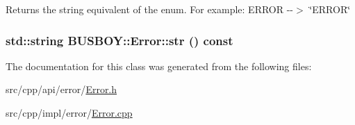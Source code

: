 Returns the string equivalent of the enum. For example: ERROR -\/-\/$>$ \char`\"{}ERROR\char`\"{} \hypertarget{classBUSBOY_1_1Error_a9adf9f03fe27d57c0aa25fa43c126421}{
\subsubsection[{str}]{\setlength{\rightskip}{0pt plus 5cm}std::string BUSBOY::Error::str () const}}
\label{classBUSBOY_1_1Error_a9adf9f03fe27d57c0aa25fa43c126421}


The documentation for this class was generated from the following files:\begin{DoxyCompactItemize}
\item 
src/cpp/api/error/\hyperlink{Error_8h}{Error.h}\item 
src/cpp/impl/error/\hyperlink{Error_8cpp}{Error.cpp}\end{DoxyCompactItemize}
